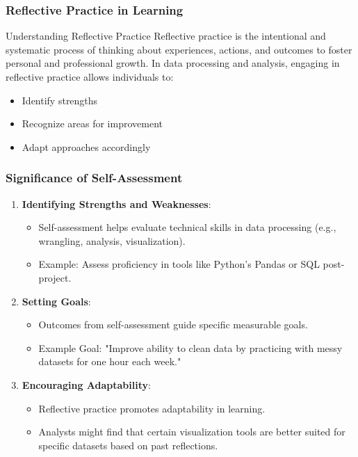 \documentclass[aspectratio=169]{beamer}
\begin{document}
\begin{frame}[fragile]
    \frametitle{Reflective Practice in Learning}
    \begin{block}{Understanding Reflective Practice}
        Reflective practice is the intentional and systematic process of thinking about experiences, actions, and outcomes to foster personal and professional growth.
        In data processing and analysis, engaging in reflective practice allows individuals to:
        \begin{itemize}
            \item Identify strengths
            \item Recognize areas for improvement
            \item Adapt approaches accordingly
        \end{itemize}
    \end{block}
\end{frame}

\begin{frame}[fragile]
    \frametitle{Significance of Self-Assessment}
    \begin{enumerate}
        \item \textbf{Identifying Strengths and Weaknesses}:
            \begin{itemize}
                \item Self-assessment helps evaluate technical skills in data processing (e.g., wrangling, analysis, visualization).
                \item Example: Assess proficiency in tools like Python's Pandas or SQL post-project.
            \end{itemize}

        \item \textbf{Setting Goals}:
            \begin{itemize}
                \item Outcomes from self-assessment guide specific measurable goals.
                \item Example Goal: "Improve ability to clean data by practicing with messy datasets for one hour each week."
            \end{itemize}

        \item \textbf{Encouraging Adaptability}:
            \begin{itemize}
                \item Reflective practice promotes adaptability in learning.
                \item Analysts might find that certain visualization tools are better suited for specific datasets based on past reflections.
            \end{itemize}
    \end{enumerate}
\end{frame}
\end{document}
